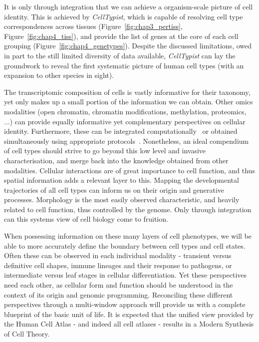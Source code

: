 It is only through integration that we can achieve a organism-scale picture of cell identity. This is achieved by \textit{CellTypist}, which is capable of resolving cell type correspondences across tissues (Figure~\ref{fig:chap3_pertiss}, Figure~\ref{fig:chap4_tiss}), and provide the list of genes at the core of each cell grouping (Figure~\ref{fig:chap4_genetypes}). Despite the discussed limitations, owed in part to the still limited diversity of data available, \textit{CellTypist} can lay the groundwork to reveal the first systematic picture of human cell types (with an expansion to other species in sight).

The transcriptomic composition of cells is vastly informative for their taxonomy, yet  only makes up a small portion of the information we can obtain. Other omics modalities (open chromatin, chromatin modifications, methylation, proteomics, ...) can provide equally informative yet complementary perspectives on cellular identity. Furthermore, these can be integrated computationally~\citep{stuart_comprehensive_2019} or obtained simultaneously using appropriate protocols~\citep{angermueller_parallel_2016,clark_scnmt-seq_2018}. Nonetheless, an ideal compendium of cell types should strive to go beyond this low level and invasive characterisation, and merge back into the knowledge obtained from other modalities. Cellular interactions are of great importance to cell function, and thus spatial information adds a relevant layer to this. Mapping the developmental trajectories of all cell types can inform us on their origin and generative processes. Morphology is the most easily observed characteristic, and heavily related to cell function, thus controlled by the genome. Only through integration can this systems view of cell biology come to fruition.

When possessing information on these many layers of cell phenotypes, we will be able to more accurately define the boundary between cell types and cell states. Often these can be observed in each individual modality - transient versus definitive cell shapes, immune lineages and their response to pathogens, or intermediate versus leaf stages in cellular differentiation. Yet these perspectives need each other, as cellular form and function should be understood in the context of its origin and genomic programming. Reconciling these different perspectives through a multi-window approach will provide us with a complete blueprint of the basic unit of life. It is expected that the unified view provided by the Human Cell Atlas - and indeed all cell atlases - results in a Modern Synthesis of Cell Theory.


